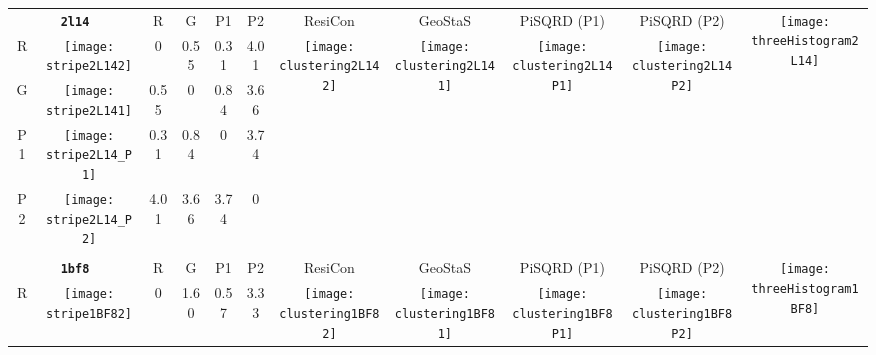 \documentclass[a4paper,11pt,twoside]{book}%
\begin{document}
\begin{appendices}
\begin{sidewaystable}[h!]
\sffamily
\begin{tabular*}{4cm}{cc|c|c|c|c|c|c|c|c|c|}
\cline{1-11}
\multicolumn{2}{|c|}{{\bf \texttt{2l14}}} & R & G & P1 & P2 & ResiCon & GeoStaS & PiSQRD (P1) & PiSQRD (P2) & \multirow{5}{*}{\vspace{-0.15cm}\texttt{[image: threeHistogram2L14]}}  \\
\cline{1-10}
\multicolumn{1}{|c|}{R} & \texttt{[image: stripe2L142]} & 0 & 0.55 & 0.31 & 4.01 & \multirow{4}{*}{\vspace{-0.3cm}\texttt{[image: clustering2L142]}} & \multirow{4}{*}{\vspace{-0.3cm}\texttt{[image: clustering2L141]}} & \multirow{4}{*}{\vspace{-0.3cm}\texttt{[image: clustering2L14P1]}} & \multirow{4}{*}{\vspace{-0.3cm}\texttt{[image: clustering2L14P2]}} &  \multirow{5}{*}{} \\
\cline{1-6}
\multicolumn{1}{|c|}{G} & \texttt{[image: stripe2L141]} & 0.55 & 0 & 0.84 & 3.66 & \multirow{4}{*}{} & \multirow{4}{*}{} & \multirow{4}{*}{} & \multirow{4}{*}{} & \multirow{5}{*}{} \\
\cline{1-6}
\multicolumn{1}{|c|}{P1} & \texttt{[image: stripe2L14\_P1]} & 0.31 & 0.84 & 0 & 3.74 & \multirow{4}{*}{} & \multirow{4}{*}{} & \multirow{4}{*}{} & \multirow{4}{*}{} & \multirow{5}{*}{}  \\
\cline{1-6}
\multicolumn{1}{|c|}{P2} & \texttt{[image: stripe2L14\_P2]} & 4.01 & 3.66 & 3.74 & 0 & \multirow{4}{*}{} & \multirow{4}{*}{} & \multirow{4}{*}{} & \multirow{4}{*}{} & \multirow{5}{*}{}  \\
\cline{1-11}
\\
\cline{1-11}
\multicolumn{2}{|c|}{{\bf \texttt{1bf8}}} & R & G & P1 & P2 & ResiCon & GeoStaS & PiSQRD (P1) & PiSQRD (P2) & \multirow{5}{*}{\vspace{-0.15cm}\texttt{[image: threeHistogram1BF8]}}  \\
\cline{1-10}
\multicolumn{1}{|c|}{R} & \texttt{[image: stripe1BF82]} & 0 & 1.60 & 0.57 & 3.33 & \multirow{4}{*}{\vspace{-0.3cm}\texttt{[image: clustering1BF82]}} & \multirow{4}{*}{\vspace{-0.3cm}\texttt{[image: clustering1BF81]}} & \multirow{4}{*}{\vspace{-0.3cm}\texttt{[image: clustering1BF8P1]}} & \multirow{4}{*}{\vspace{-0.3cm}\texttt{[image: clustering1BF8P2]}} &  \multirow{5}{*}{} \\

\end{tabular*}
\end{sidewaystable}
\end{appendices}
\end{document}
